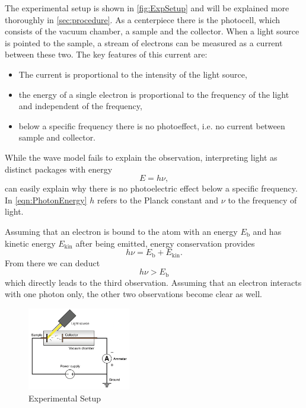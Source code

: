 The experimental setup is shown in \autoref{fig:ExpSetup} and will be explained more thoroughly in
\autoref{sec:procedure}. As a centerpiece there is the photocell, which consists of the vacuum
chamber, a sample and the collector. When a light source is pointed to the sample, a stream of
electrons can be measured as a current between these two. The key features of this current are:
\begin{itemize}
  \item The current is proportional to the intensity of the light source,
  \item the energy of a single electron is proportional to the frequency of the light and
    independent of the frequency,
  \item below a specific frequency there is no photoeffect, i.e. no current between sample and
    collector.
\end{itemize}
While the wave model fails to explain the  observation, interpreting light as distinct
packages with energy
\begin{equation}
  E = h\nu,
  \label{eqn:PhotonEnergy}
\end{equation}
can easily explain why there is no photoelectric effect below a specific frequency.
In \autoref{eqn:PhotonEnergy} $h$ refers to the Planck constant and $\nu$ to the frequency of
light.

Assuming that an electron is bound to the atom with an energy $E_\text{b}$ and has kinetic energy
$E_\text{kin}$ after being emitted, energy conservation provides
\begin{equation}
    h\nu = E_\text{b} + E_\text{kin}.
    \label{eqn:EnergyConservation}
\end{equation}
From there we can deduct 
\[
  h\nu > E_\text{b}
\]
which directly leads to the third observation. Assuming that an electron interacts with one photon
only, the other two observations become clear as well.

\begin{figure}
    \centering
    \includegraphics[width=0.4\textwidth]{media/ExperimentalSetup.png}
    \caption{Experimental Setup}
    \label{fig:ExpSetup}
\end{figure}

